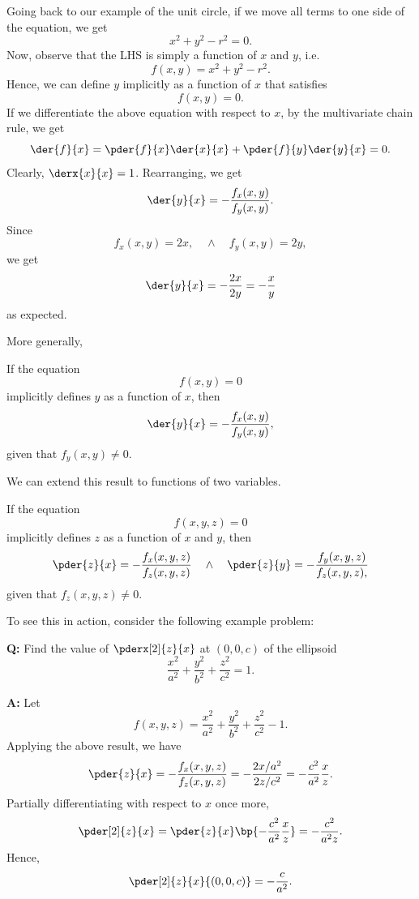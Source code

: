 Going back to our example of the unit circle, if we move all terms to one side of the equation, we get \[x^2 + y^2 - r^2 = 0.\] Now, observe that the LHS is simply a function of $x$ and $y$, i.e. \[f(x, y) = x^2 + y^2 - r^2.\] Hence, we can define $y$ implicitly as a function of $x$ that satisfies \[f(x, y) = 0.\] If we differentiate the above equation with respect to $x$, by the multivariate chain rule, we get \[\der{f}{x} = \pder{f}{x} \der{x}{x} + \pder{f}{y} \der{y}{x} = 0.\] Clearly, $\derx{x}{x} = 1$. Rearranging, we get \[\der{y}{x} = -\frac{f_x(x, y)}{f_y(x, y)}.\] Since \[f_x(x, y) = 2x, \quad \land \quad f_y(x, y) = 2y,\] we get \[\der{y}{x} = -\frac{2x}{2y} = -\frac{x}{y}\] as expected. 

More generally,
\begin{proposition}
    If the equation \[f(x, y) = 0\] implicitly defines $y$ as a function of $x$, then \[\der{y}{x} = -\frac{f_x(x, y)}{f_y(x,  y)},\] given that $f_y(x, y) \neq 0$.
\end{proposition}

We can extend this result to functions of two variables.
\begin{proposition}
    If the equation \[f(x, y, z) = 0\] implicitly defines $z$ as a function of $x$ and $y$, then \[\pder{z}{x} = -\frac{f_x(x, y, z)}{f_z(x,  y, z)} \quad \land \quad \pder{z}{y} = -\frac{f_y(x, y, z)}{f_z(x, y, z),}\] given that $f_z(x, y, z) \neq 0$.
\end{proposition}

To see this in action, consider the following example problem:

\begin{example}
    \phantom{.}

    \textbf{Q:} Find the value of $\pderx[2]{z}{x}$ at $(0, 0, c)$ of the ellipsoid \[\frac{x^2}{a^2} + \frac{y^2}{b^2} + \frac{z^2}{c^2} = 1.\]

    \textbf{A:} Let \[f(x, y, z) = \frac{x^2}{a^2} + \frac{y^2}{b^2} + \frac{z^2}{c^2} - 1.\] Applying the above result, we have \[\pder{z}{x} = -\frac{f_x(x, y, z)}{f_z(x,  y, z)} = -\frac{2x / a^2}{2z / c^2} = -\frac{c^2}{a^2} \frac{x}{z}.\] Partially differentiating with respect to $x$ once more, \[\pder[2]{z}{x} = \pder{z}{x} \bp{-\frac{c^2}{a^2} \frac{x}{z}} = -\frac{c^2}{a^2 z}.\] Hence, \[\pder[2]{z}{x}{(0, 0, c)} = -\frac{c}{a^2}.\]
\end{example}

